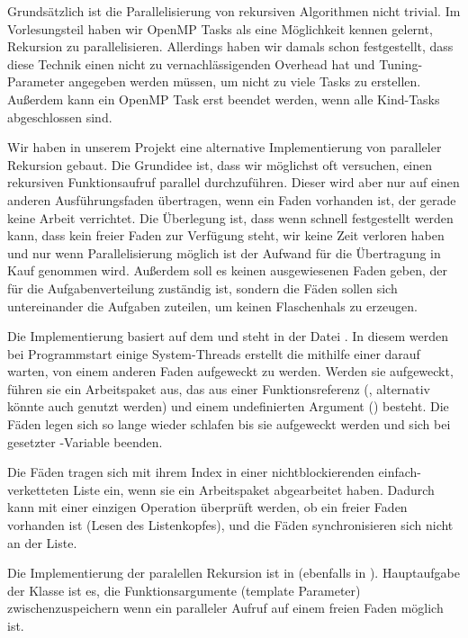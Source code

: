 Grundsätzlich ist die Parallelisierung von rekursiven Algorithmen nicht trivial. Im Vorlesungsteil haben wir OpenMP Tasks als eine Möglichkeit kennen gelernt, Rekursion zu parallelisieren. Allerdings haben wir damals schon festgestellt, dass diese Technik einen nicht zu vernachlässigenden Overhead hat und Tuning-Parameter angegeben werden müssen, um nicht zu viele Tasks zu erstellen. Außerdem kann ein OpenMP Task erst beendet werden, wenn alle Kind-Tasks abgeschlossen sind.

Wir haben in unserem Projekt eine alternative Implementierung von paralleler Rekursion gebaut. Die Grundidee ist, dass wir möglichst oft versuchen, einen rekursiven Funktionsaufruf parallel durchzuführen. Dieser wird aber nur auf einen anderen Ausführungsfaden übertragen, wenn ein Faden vorhanden ist, der gerade keine Arbeit verrichtet. Die Überlegung ist, dass wenn schnell festgestellt werden kann, dass kein freier Faden zur Verfügung steht, wir keine Zeit verloren haben und nur wenn Parallelisierung möglich ist der Aufwand für die Übertragung in Kauf genommen wird. Außerdem soll es keinen ausgewiesenen Faden geben, der für die Aufgabenverteilung zuständig ist, sondern die Fäden sollen sich untereinander die Aufgaben zuteilen, um keinen Flaschenhals zu erzeugen.

Die Implementierung basiert auf dem  und steht in der Datei . In diesem werden bei Programmstart einige System-Threads erstellt die mithilfe einer  darauf warten, von einem anderen Faden aufgeweckt zu werden. Werden sie aufgeweckt, führen sie ein Arbeitspaket aus, das aus einer Funktionsreferenz (, alternativ könnte auch  genutzt werden) und einem undefinierten Argument () besteht. Die Fäden legen sich so lange wieder schlafen bis sie aufgeweckt werden und sich bei gesetzter -Variable beenden.

Die Fäden tragen sich mit ihrem Index in einer nichtblockierenden einfach-verketteten Liste ein, wenn sie ein Arbeitspaket abgearbeitet haben. Dadurch kann mit einer einzigen Operation überprüft werden, ob ein freier Faden vorhanden ist (Lesen des Listenkopfes), und die Fäden synchronisieren sich nicht an der Liste.

Die Implementierung der paralellen Rekursion ist in  (ebenfalls in ). Hauptaufgabe der Klasse ist es, die Funktionsargumente (template Parameter) zwischenzuspeichern wenn ein paralleler Aufruf auf einem freien Faden möglich ist.

